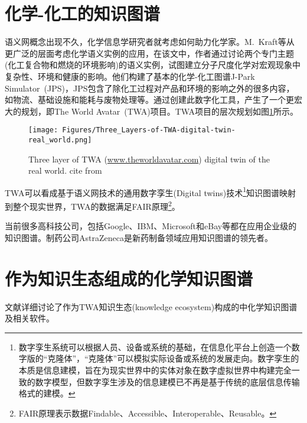 \section{化学-化工的知识图谱}
语义网概念出现不久，化学信息学研究者就考虑如何助力化学家。\textrm{M.~Kraft}等从更广泛的层面考虑化学语义实例的应用，在该文中，作者通过讨论两个专门主题(化工复合物和燃烧的环境影响)的语义实例，试图建立分子尺度化学对宏观现象中复杂性、环境和健康的影响。他们构建了基本的化学-化工图谱\textrm{J-Park Simulator~(JPS)}，\textrm{JPS}包含了除化工过程对产品和环境的影响之外的很多内容，如物流、基础设施和能耗与废物处理等。通过创建此数字化工具，产生了一个更宏大的规划，即\textrm{The World Avatar~(TWA)}项目。\textrm{TWA}项目的层次规划如图\ref{Fig:Three_Layers-of-TWA}所示。
\begin{figure}[h!]
\centering
\texttt{[image: Figures/Three\_Layers-of-TWA-digital-twin-real\_world.png]}
\caption{\small\textrm{Three layer of TWA (\url{www.theworldavatar.com}) digital twin of the real world. cite from\cite{ACR56-128_2023}}}%
\label{Fig:Three_Layers-of-TWA}
\end{figure}
\textrm{TWA}可以看成基于语义网技术的通用数字孪生\textrm{(Digital twins)}技术\footnote{数字孪生系统可以根据人员、设备或系统的基础，在信息化平台上创造一个数字版的“克隆体”，“克隆体”可以模拟实际设备或系统的发展走向。数字孪生的本质是信息建模，旨在为现实世界中的实体对象在数字虚拟世界中构建完全一致的数字模型，但数字孪生涉及的信息建模已不再是基于传统的底层信息传输格式的建模。}知识图谱映射到整个现实世界，\textrm{TWA}的数据满足\textrm{FAIR}原理\footnote{\textrm{FAIR}原理表示数据\textrm{Findable}、\textrm{Accessible}、\textrm{Interoperable}、\textrm{Reusable}。}。

当前很多高科技公司，包括\textrm{Google}、\textrm{IBM}、\textrm{Microsoft}和\textrm{eBay}等都在应用企业级的知识图谱。制药公司\textrm{AstraZeneca}是新药制备领域应用知识图谱的领先者。

\section{作为知识生态组成的化学知识图谱}
文献\cite{ACR56-128_2023}详细讨论了作为\textrm{TWA}知识生态\textrm{(knowledge ecosystem)}构成的中化学知识图谱及相关软件。
